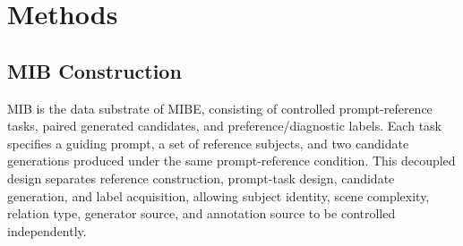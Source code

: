 \documentclass{article}
\begin{document}




\section{Methods}
\subsection{MIB Construction}

MIB is the data substrate of MIBE, consisting of controlled prompt-reference tasks, paired generated candidates, and preference/diagnostic labels. Each task specifies a guiding prompt, a set of reference subjects, and two candidate generations produced under the same prompt-reference condition. This decoupled design separates reference construction, prompt-task design, candidate generation, and label acquisition, allowing subject identity, scene complexity, relation type, generator source, and annotation source to be controlled independently.
\end{document}
